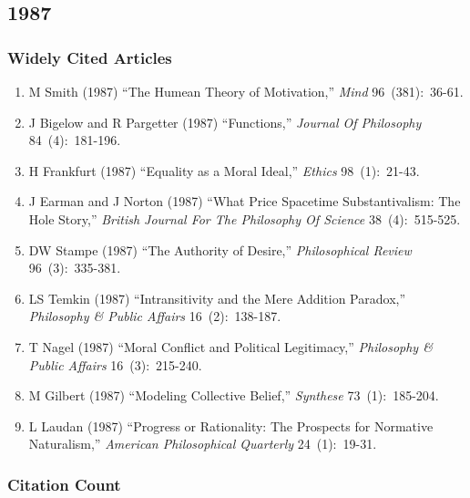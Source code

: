 \documentclass[
  10pt,
  letterpaper,
  DIV=11,
  numbers=noendperiod,
  twoside]{scrartcl}
\providecommand{\tightlist}{%
  \setlength{\itemsep}{0pt}\setlength{\parskip}{0pt}}\usepackage{longtable,booktabs,array}
\begin{document}
\newpage

\subsection{1987}\label{sec-s1987}

\subsubsection*{Widely Cited Articles}\label{widely-cited-articles-30}

\begin{enumerate}
\def\labelenumi{\arabic{enumi}.}
\tightlist
\item
  M Smith (1987) ``The Humean Theory of Motivation,'' \emph{Mind}
  96~(381):~36-61.
\item
  J Bigelow and R Pargetter (1987) ``Functions,'' \emph{Journal Of
  Philosophy} 84~(4):~181-196.
\item
  H Frankfurt (1987) ``Equality as a Moral Ideal,'' \emph{Ethics}
  98~(1):~21-43.
\item
  J Earman and J Norton (1987) ``What Price Spacetime Substantivalism:
  The Hole Story,'' \emph{British Journal For The Philosophy Of Science}
  38~(4):~515-525.
\item
  DW Stampe (1987) ``The Authority of Desire,'' \emph{Philosophical
  Review} 96~(3):~335-381.
\item
  LS Temkin (1987) ``Intransitivity and the Mere Addition Paradox,''
  \emph{Philosophy \& Public Affairs} 16~(2):~138-187.
\item
  T Nagel (1987) ``Moral Conflict and Political Legitimacy,''
  \emph{Philosophy \& Public Affairs} 16~(3):~215-240.
\item
  M Gilbert (1987) ``Modeling Collective Belief,'' \emph{Synthese}
  73~(1):~185-204.
\item
  L Laudan (1987) ``Progress or Rationality: The Prospects for Normative
  Naturalism,'' \emph{American Philosophical Quarterly} 24~(1):~19-31.
\end{enumerate}

\subsubsection*{Citation Count}\label{sec-count-1987}
\end{document}
